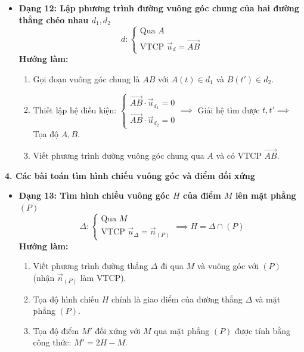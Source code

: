 \documentclass[12pt,a4paper]{article}
\begin{document}
\begin{theorybox}
\begin{itemize}
        \item \textbf{Dạng 12: Lập phương trình đường vuông góc chung của hai đường thẳng chéo nhau $d_1, d_2$}
        \[
            d\colon \begin{cases} \text{Qua } A \\ \text{VTCP } \vec{u}_d = \vec{AB} \end{cases}
        \]
        \textbf{Hướng làm:}
        \begin{enumerate}
            \item Gọi đoạn vuông góc chung là $AB$ với $A(t) \in d_1$ và $B(t') \in d_2$.
            \item Thiết lập hệ điều kiện: $\begin{cases} \vec{AB} \cdot \vec{u}_{d_1} = 0 \\ \vec{AB} \cdot \vec{u}_{d_2} = 0 \end{cases} \implies$ Giải hệ tìm được $t, t' \implies$ Tọa độ $A, B$.
            \item Viết phương trình đường vuông góc chung qua $A$ và có VTCP $\vec{AB}$.
        \end{enumerate}
    \end{itemize}

    \vspace{0.15cm}
    \textbf{\textcolor{deepblue}{\large 4. Các bài toán tìm hình chiếu vuông góc và điểm đối xứng}}
    \begin{itemize}\setlength{\itemsep}{10pt}
        \item \textbf{Dạng 13: Tìm hình chiếu vuông góc $H$ của điểm $M$ lên mặt phẳng $(P)$}
        \[
            \Delta\colon \begin{cases} \text{Qua } M \\ \text{VTCP } \vec{u}_\Delta = \vec{n}_{(P)} \end{cases} \implies H = \Delta \cap (P)
        \]
        \textbf{Hướng làm:}
        \begin{enumerate}
            \item Viết phương trình đường thẳng $\Delta$ đi qua $M$ và vuông góc với $(P)$ (nhận $\vec{n}_{(P)}$ làm VTCP).
            \item Tọa độ hình chiếu $H$ chính là giao điểm của đường thẳng $\Delta$ và mặt phẳng $(P)$.
            \item Tọa độ điểm $M'$ đối xứng với $M$ qua mặt phẳng $(P)$ được tính bằng công thức: $M' = 2H - M$.
        \end{enumerate}


\end{itemize}
\end{theorybox}
\end{document}
